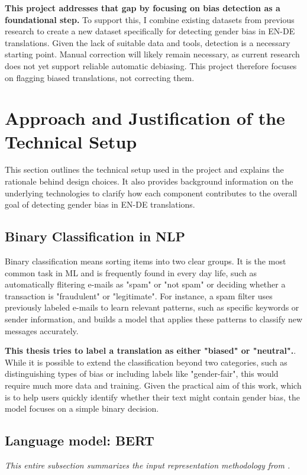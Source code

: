     \textbf{This project addresses that gap by focusing on bias detection as a foundational step.} To support this, I combine existing datasets from previous research to create a new dataset specifically for detecting gender bias in EN-DE translations. Given the lack of suitable data and tools, detection is a necessary starting point. Manual correction will likely remain necessary, as current research does not yet support reliable automatic debiasing. This project therefore focuses on flagging biased translations, not correcting them.


\section{Approach and Justification of the Technical Setup}
    This section outlines the technical setup used in the project and explains the rationale behind design choices. It also provides background information on the underlying technologies to clarify how each component contributes to the overall goal of detecting gender bias in EN-DE translations.

\subsection{Binary Classification in NLP}
    Binary classification means sorting items into two clear groups. It is the most common task in ML and is frequently found in every day life, such as automatically flitering e-mails as "spam" or "not spam" \citep{quemyBinaryClassificationUnstructured2019} or deciding whether a transaction is "fraudulent" or "legitimate". For instance, a spam filter uses previously labeled e-mails to learn relevant patterns, such as specific keywords or sender information, and builds a model that applies these patterns to classify new messages accurately. 
    
    \textbf{This thesis tries to label a translation as either "biased" or "neutral".}. While it is possible to extend the classification beyond two categories, such as distinguishing types of bias or including labels like "gender-fair", this would require much more data and training. Given the practical aim of this work, which is to help users quickly identify whether their text might contain gender bias, the model focuses on a simple binary decision.

\subsection{Language model: BERT}
    \emph{This entire subsection summarizes the input representation methodology from \citet{devlinBERTPretrainingDeep2019}.}

